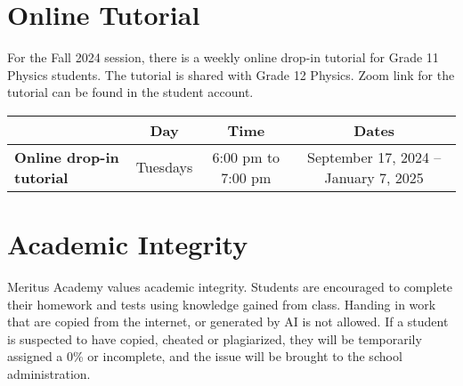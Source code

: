 \documentclass{../oss-handout}
\begin{document}
\section{Online Tutorial}
\label{tutorial}
For the Fall 2024 session, there is a weekly online drop-in tutorial for Grade
11 Physics students. The tutorial is shared with Grade 12 Physics. Zoom
link for the tutorial can be found in the student account.
\begin{center}
  \bgroup
  \def\arraystretch{1.15}
  \begin{tabular}{|l|c|c|c|}
    \rowcolor{lightgray}
    \hline
    & \textbf{Day} & \textbf{Time} & \textbf{Dates} \\
    \hline\hline
    \textbf{Online drop-in tutorial} &
    Tuesdays & 6:00 pm to 7:00 pm & September 17, 2024 -- January 7, 2025 \\
    \hline
  \end{tabular}
  \egroup
\end{center}


\section{Academic Integrity}
Meritus Academy values academic integrity. Students are encouraged to complete
their homework and tests using knowledge gained from class. Handing in work
that are copied from the internet, or generated by AI is not allowed. If a
student is suspected to have copied, cheated or plagiarized, they will be
temporarily assigned a 0\% or incomplete, and the issue will be brought to the
school administration.
\end{document}
